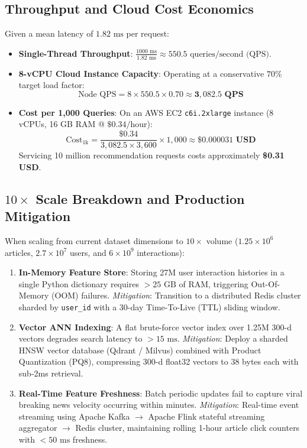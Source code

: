 \documentclass[11pt,a4paper]{article}
\begin{document}
\subsection{Throughput and Cloud Cost Economics}
Given a mean latency of $1.82\text{ ms}$ per request:
\begin{itemize}[noitemsep,topsep=1pt,leftmargin=*]
    \item \textbf{Single-Thread Throughput}: $\frac{1000\text{ ms}}{1.82\text{ ms}} \approx 550.5\text{ queries/second (QPS)}$.
    \item \textbf{8-vCPU Cloud Instance Capacity}: Operating at a conservative $70\%$ target load factor:
    \begin{equation}
    \text{Node QPS} = 8 \times 550.5 \times 0.70 \approx \mathbf{3,082.5\text{ QPS}}
    \end{equation}
    \item \textbf{Cost per 1,000 Queries}: On an AWS EC2 \texttt{c6i.2xlarge} instance (8 vCPUs, 16 GB RAM @ $\$0.34\text{/hour}$):
    \begin{equation}
    \text{Cost}_{1\text{k}} = \frac{\$0.34}{3,082.5 \times 3,600} \times 1,000 \approx \mathbf{\$0.000031\text{ USD}}
    \end{equation}
    Servicing 10 million recommendation requests costs approximately \textbf{\$0.31 USD}.
\end{itemize}

\subsection{\texorpdfstring{$10\times$}{10x} Scale Breakdown and Production Mitigation}
When scaling from current dataset dimensions to $10\times$ volume ($1.25\times 10^6$ articles, $2.7\times 10^7$ users, and $6\times 10^9$ interactions):

\begin{enumerate}[leftmargin=*,noitemsep,topsep=1pt]
    \item \textbf{In-Memory Feature Store}: Storing 27M user interaction histories in a single Python dictionary requires $>25\text{ GB}$ of RAM, triggering Out-Of-Memory (OOM) failures. \textit{Mitigation}: Transition to a distributed Redis cluster sharded by \texttt{user\_id} with a 30-day Time-To-Live (TTL) sliding window.
    \item \textbf{Vector ANN Indexing}: A flat brute-force vector index over 1.25M 300-d vectors degrades search latency to $>15\text{ ms}$. \textit{Mitigation}: Deploy a sharded HNSW vector database (Qdrant / Milvus) combined with Product Quantization (PQ8), compressing 300-d float32 vectors to 38 bytes each with sub-2ms retrieval.
    \item \textbf{Real-Time Feature Freshness}: Batch periodic updates fail to capture viral breaking news velocity occurring within minutes. \textit{Mitigation}: Real-time event streaming using Apache Kafka $\to$ Apache Flink stateful streaming aggregator $\to$ Redis cluster, maintaining rolling 1-hour article click counters with $<50\text{ ms}$ freshness.
\end{enumerate}
\end{document}
